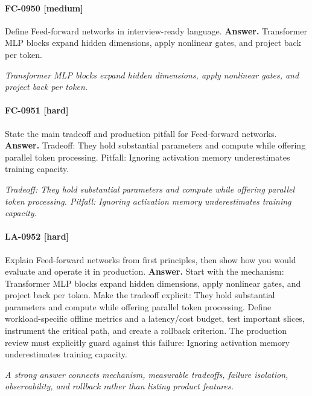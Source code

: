 \paragraph{FC-0950 [medium]} Define Feed-forward networks in interview-ready language.
\noindent\textbf{Answer.} Transformer MLP blocks expand hidden dimensions, apply nonlinear gates, and project back per token.
\par\textit{Transformer MLP blocks expand hidden dimensions, apply nonlinear gates, and project back per token.}
\paragraph{FC-0951 [hard]} State the main tradeoff and production pitfall for Feed-forward networks.
\noindent\textbf{Answer.} Tradeoff: They hold substantial parameters and compute while offering parallel token processing. Pitfall: Ignoring activation memory underestimates training capacity.
\par\textit{Tradeoff: They hold substantial parameters and compute while offering parallel token processing. Pitfall: Ignoring activation memory underestimates training capacity.}
\paragraph{LA-0952 [hard]} Explain Feed-forward networks from first principles, then show how you would evaluate and operate it in production.
\noindent\textbf{Answer.} Start with the mechanism: Transformer MLP blocks expand hidden dimensions, apply nonlinear gates, and project back per token. Make the tradeoff explicit: They hold substantial parameters and compute while offering parallel token processing. Define workload-specific offline metrics and a latency/cost budget, test important slices, instrument the critical path, and create a rollback criterion. The production review must explicitly guard against this failure: Ignoring activation memory underestimates training capacity.
\par\textit{A strong answer connects mechanism, measurable tradeoffs, failure isolation, observability, and rollback rather than listing product features.}
